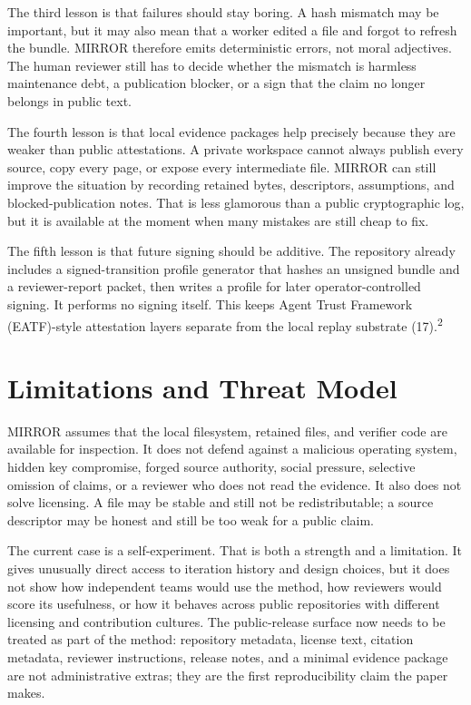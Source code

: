 \documentclass[10pt]{article}
\newcommand{\note}[1]{\textsuperscript{#1}}
\newcommand{\mirror}{MIRROR}
\begin{document}
The third lesson is that failures should stay boring. A hash mismatch may be important, but it may also mean that a worker edited a file and forgot to refresh the bundle. \mirror{} therefore emits deterministic errors, not moral adjectives. The human reviewer still has to decide whether the mismatch is harmless maintenance debt, a publication blocker, or a sign that the claim no longer belongs in public text.

The fourth lesson is that local evidence packages help precisely because they are weaker than public attestations. A private workspace cannot always publish every source, copy every page, or expose every intermediate file. \mirror{} can still improve the situation by recording retained bytes, descriptors, assumptions, and blocked-publication notes. That is less glamorous than a public cryptographic log, but it is available at the moment when many mistakes are still cheap to fix.

The fifth lesson is that future signing should be additive. The repository already includes a signed-transition profile generator that hashes an unsigned bundle and a reviewer-report packet, then writes a profile for later operator-controlled signing. It performs no signing itself. This keeps Agent Trust Framework (EATF)-style attestation layers separate from the local replay substrate (17).\note{2}

\section{Limitations and Threat Model}

\mirror{} assumes that the local filesystem, retained files, and verifier code are available for inspection. It does not defend against a malicious operating system, hidden key compromise, forged source authority, social pressure, selective omission of claims, or a reviewer who does not read the evidence. It also does not solve licensing. A file may be stable and still not be redistributable; a source descriptor may be honest and still be too weak for a public claim.

The current case is a self-experiment. That is both a strength and a limitation. It gives unusually direct access to iteration history and design choices, but it does not show how independent teams would use the method, how reviewers would score its usefulness, or how it behaves across public repositories with different licensing and contribution cultures. The public-release surface now needs to be treated as part of the method: repository metadata, license text, citation metadata, reviewer instructions, release notes, and a minimal evidence package are not administrative extras; they are the first reproducibility claim the paper makes.
\end{document}

